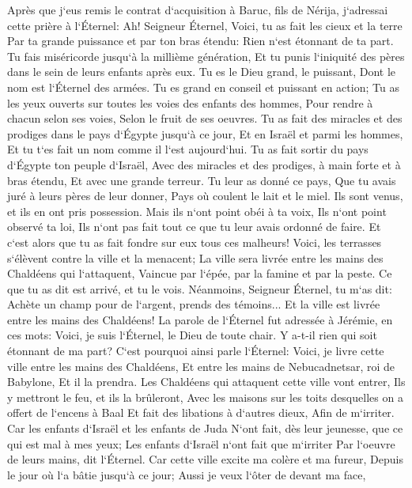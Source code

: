 \verse Après que j`eus remis le contrat d`acquisition à Baruc, fils de Nérija, j`adressai cette prière à l`Éternel: 
\verse Ah! Seigneur Éternel, Voici, tu as fait les cieux et la terre Par ta grande puissance et par ton bras étendu: Rien n`est étonnant de ta part. 
\verse Tu fais miséricorde jusqu`à la millième génération, Et tu punis l`iniquité des pères dans le sein de leurs enfants après eux. Tu es le Dieu grand, le puissant, Dont le nom est l`Éternel des armées. 
\verse Tu es grand en conseil et puissant en action; Tu as les yeux ouverts sur toutes les voies des enfants des hommes, Pour rendre à chacun selon ses voies, Selon le fruit de ses oeuvres. 
\verse Tu as fait des miracles et des prodiges dans le pays d`Égypte jusqu`à ce jour, Et en Israël et parmi les hommes, Et tu t`es fait un nom comme il l`est aujourd`hui. 
\verse Tu as fait sortir du pays d`Égypte ton peuple d`Israël, Avec des miracles et des prodiges, à main forte et à bras étendu, Et avec une grande terreur. 
\verse Tu leur as donné ce pays, Que tu avais juré à leurs pères de leur donner, Pays où coulent le lait et le miel. 
\verse Ils sont venus, et ils en ont pris possession. Mais ils n`ont point obéi à ta voix, Ils n`ont point observé ta loi, Ils n`ont pas fait tout ce que tu leur avais ordonné de faire. Et c`est alors que tu as fait fondre sur eux tous ces malheurs! 
\verse Voici, les terrasses s`élèvent contre la ville et la menacent; La ville sera livrée entre les mains des Chaldéens qui l`attaquent, Vaincue par l`épée, par la famine et par la peste. Ce que tu as dit est arrivé, et tu le vois. 
\verse Néanmoins, Seigneur Éternel, tu m`as dit: Achète un champ pour de l`argent, prends des témoins... Et la ville est livrée entre les mains des Chaldéens! 
\verse La parole de l`Éternel fut adressée à Jérémie, en ces mots: 
\verse Voici, je suis l`Éternel, le Dieu de toute chair. Y a-t-il rien qui soit étonnant de ma part? 
\verse C`est pourquoi ainsi parle l`Éternel: Voici, je livre cette ville entre les mains des Chaldéens, Et entre les mains de Nebucadnetsar, roi de Babylone, Et il la prendra. 
\verse Les Chaldéens qui attaquent cette ville vont entrer, Ils y mettront le feu, et ils la brûleront, Avec les maisons sur les toits desquelles on a offert de l`encens à Baal Et fait des libations à d`autres dieux, Afin de m`irriter. 
\verse Car les enfants d`Israël et les enfants de Juda N`ont fait, dès leur jeunesse, que ce qui est mal à mes yeux; Les enfants d`Israël n`ont fait que m`irriter Par l`oeuvre de leurs mains, dit l`Éternel. 
\verse Car cette ville excite ma colère et ma fureur, Depuis le jour où l`a bâtie jusqu`à ce jour; Aussi je veux l`ôter de devant ma face, 
